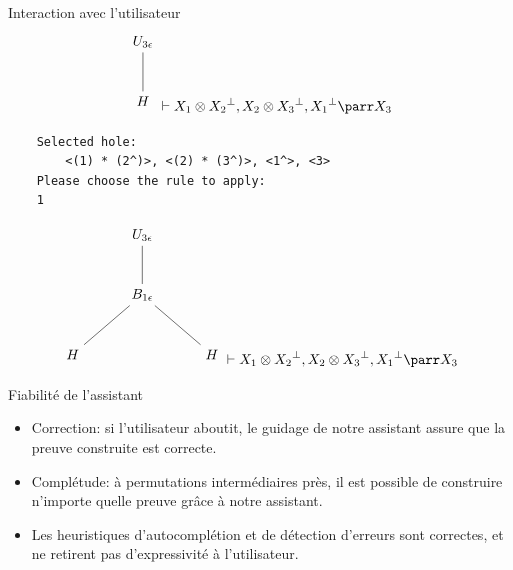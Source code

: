 \documentclass{beamer}
\newcommand*{\orth}{^\perp}
\newcommand*{\tensor}{\otimes}
\newcommand*{\unknown}{H}
\begin{document}
\begin{frame}[containsverbatim]{Interaction avec l'utilisateur}
    \begin{equation*}
        \begin{tikzpicture}%
            [level 2/.style={sibling distance=3.5cm}]
            \node {$U_{3 \epsilon}$}
            child {node {$\unknown$}
            };
        \end{tikzpicture} \vdash X_1 \tensor {X_2}\orth, X_2 \tensor {X_3}\orth, {X_1}\orth \parr X_3
    \end{equation*}

    \begin{verbatim}
    Selected hole: 
        <(1) * (2^)>, <(2) * (3^)>, <1^>, <3>
    Please choose the rule to apply:
    1
    \end{verbatim}

    \begin{equation*}
        \begin{tikzpicture}%
            [level 2/.style={sibling distance=3.5cm}]
            \node {$U_{3 \epsilon}$}
            child {node {$B_{1 \epsilon}$}
                child {node {$\unknown$}}
                child {node {$\unknown$}}
            };
        \end{tikzpicture} \vdash X_1 \tensor {X_2}\orth, X_2 \tensor {X_3}\orth, {X_1}\orth \parr X_3
    \end{equation*}
\end{frame}

\begin{frame}{Fiabilité de l'assistant}
    \begin{itemize}
        \item Correction: \pause si l'utilisateur aboutit, le guidage de notre assistant assure que la preuve construite est correcte.
            \pause
        \item Complétude: à permutations intermédiaires près, il est possible de construire n'importe quelle preuve grâce à notre assistant.
            \pause
        \item Les heuristiques d'autocomplétion et de détection d'erreurs sont correctes, et ne retirent pas d'expressivité à l'utilisateur.
    \end{itemize}
\end{frame}
\end{document}
